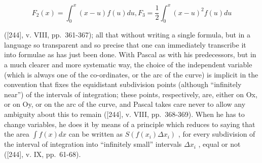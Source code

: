 \[
F _ {2} (x) = \int_ {0} ^ {x} (x - u) f (u) d u, F _ {3} = \frac {1}{2} \int_ {0} ^ {x} (x - u) ^ {2} f (u) d u
\]

({[}244{]}, v. VIII, pp.~361-367); all that without writing a single formula, but in a language so transparent and so precise that one can immediately transcribe it into formulae as has just been done. With Pascal as with his predecessors, but in a much clearer and more systematic way, the choice of the independent variable (which is always one of the co-ordinates, or the arc of the curve) is implicit in the convention that fixes the equidistant subdivision points (although ``infinitely near'') of the intervals of integration; these points, respectively, are, either on Ox, or on Oy, or on the arc of the curve, and Pascal takes care never to allow any ambiguity about this to remain ({[}244{]}, v. VIII, pp.~368-369). When he has to change variables, he does it by means of a principle which reduces to saying that the area \(\int f(x)dx\) can be written as \(S(f(x_i)\Delta x_i)\) , for every subdivision of the interval of integration into ``infinitely small'' intervals \(\Delta x_i\) , equal or not ({[}244{]}, v. IX, pp.~61-68).

